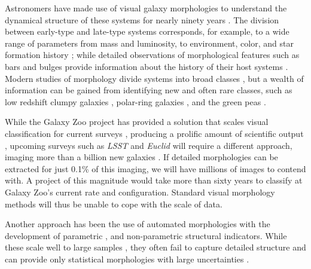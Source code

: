 \documentclass[twocolumn]{aastex6}
\begin{document}
Astronomers have made use of visual galaxy morphologies to understand the dynamical structure of these systems for nearly ninety years 
\citep[e.g.,][]{Hubble1936, 
			deVauc1959, 
			Sandage1961, 
			vandenBergh1976, 
			NairAbraham2010, 
			Baillard2011}. 
The division between early-type and late-type systems corresponds, for example, to a wide range of parameters from mass and luminosity, to environment, color, and star formation history 
\citep[e.g.,][]{Kormendy1977,  
			Dressler1980, 
			Strateva2001, 
			Blanton2003, 
			Kauffman2003, 
			Nakamura2003, 
			Shen2003, 
			Peng2010}; 
while detailed observations of morphological features such as bars and bulges 
provide information about the history of their host systems 
\citep[e.g., review by][]{KK04, 
			Elmegreen2008, 
			Sheth2008, 
			Masters2010, 
			Simmons2014}. 
Modern studies of morphology  divide systems into broad classes 
\citep[e.g.,][]{Conselice2006, 
			Lintott2008, 
			Kartaltepe2015, 
			Peth2016}, 
but a wealth of information can be gained from identifying new and often rare classes, 
such as low redshift clumpy galaxies \citep[e.g.,][]{Elmegreen2013}, polar-ring galaxies \citep[e.g.,][]{Whitmore1990}, and the green peas \citep{Cardamone2009}. 


While the Galaxy Zoo project has provided a solution that scales visual classification 
for current surveys \citep{Lintott2008, Lintott2011, Willett2013, Willett2017, Simmons2017}, 
producing a prolific amount of scientific output \citep[e.g.,][]{Land2008, Bamford2009, Darg2010, Schawinski2014, Galloway2015, Smethurst2016}, 
upcoming surveys such as \textit{LSST} and \textit{Euclid}
will require a different approach, imaging more than a billion new galaxies  \citep{LSST, Euclid}. 
If detailed morphologies can be extracted for just  0.1\% of this imaging, we will 
have millions of images to contend with. A project of this magnitude would take more than 
sixty years to classify at Galaxy Zoo's current rate and configuration. Standard visual morphology     
methods will thus be unable to cope with the scale of data. 

Another approach has been the use of automated morphologies with the development
of parametric \citep{Sersic1968, Odewahn2002, Peng2002}, 
and non-parametric \citep{Abraham1994, Conselice2003, Abraham2003, Lotz2004, Freeman2013} 
structural indicators. While these scale well to large samples 
\citep[e.g.,][]{	Simard2011, 
			Griffith2012, 
			Casteels2014, 
			Holwerda2014, 
			Meert2016}, 
they often fail to capture detailed structure and can 
provide only statistical morphologies with large uncertainties \cite[e.g.,][]{Abraham1996, Bershady2000}. 
\end{document}
